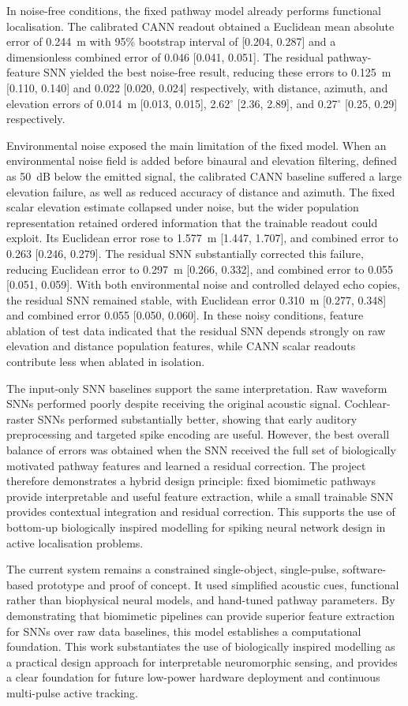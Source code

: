 In noise-free conditions, the fixed pathway model already performs functional localisation. The calibrated CANN readout obtained a Euclidean mean absolute error of 0.244~m with 95\% bootstrap interval of [0.204, 0.287] and a dimensionless combined error of 0.046 [0.041, 0.051]. The residual pathway-feature SNN yielded the best noise-free result, reducing these errors to 0.125~m [0.110, 0.140] and 0.022 [0.020, 0.024] respectively, with distance, azimuth, and elevation errors of 0.014~m [0.013, 0.015], 2.62$^\circ$ [2.36, 2.89], and 0.27$^\circ$ [0.25, 0.29] respectively.

Environmental noise exposed the main limitation of the fixed model. When an environmental noise field is added before binaural and elevation filtering, defined as 50~dB below the emitted signal, the calibrated CANN baseline suffered a large elevation failure, as well as reduced accuracy of distance and azimuth. The fixed scalar elevation estimate collapsed under noise, but the wider population representation retained ordered information that the trainable readout could exploit. Its Euclidean error rose to 1.577~m [1.447, 1.707], and combined error to 0.263 [0.246, 0.279]. The residual SNN substantially corrected this failure, reducing Euclidean error to 0.297~m [0.266, 0.332], and combined error to 0.055 [0.051, 0.059]. With both environmental noise and controlled delayed echo copies, the residual SNN remained stable, with Euclidean error 0.310~m [0.277, 0.348] and combined error 0.055 [0.050, 0.060]. In these noisy conditions, feature ablation of test data indicated that the residual SNN depends strongly on raw elevation and distance population features, while CANN scalar readouts contribute less when ablated in isolation.

The input-only SNN baselines support the same interpretation. Raw waveform SNNs performed poorly despite receiving the original acoustic signal. Cochlear-raster SNNs performed substantially better, showing that early auditory preprocessing and targeted spike encoding are useful. However, the best overall balance of errors was obtained when the SNN received the full set of biologically motivated pathway features and learned a residual correction. The project therefore demonstrates a hybrid design principle: fixed biomimetic pathways provide interpretable and useful feature extraction, while a small trainable SNN provides contextual integration and residual correction. This supports the use of bottom-up biologically inspired modelling for spiking neural network design in active localisation problems.

The current system remains a constrained single-object, single-pulse, software-based prototype and proof of concept. It used simplified acoustic cues, functional rather than biophysical neural models, and hand-tuned pathway parameters. By demonstrating that biomimetic pipelines can provide superior feature extraction for SNNs over raw data baselines, this model establishes a computational foundation. This work substantiates the use of biologically inspired modelling as a practical design approach for interpretable neuromorphic sensing, and provides a clear foundation for future low-power hardware deployment and continuous multi-pulse active tracking.
